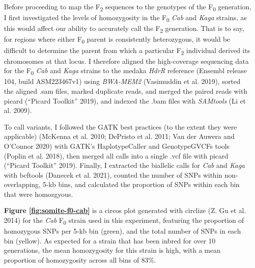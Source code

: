 \documentclass[
]{book}
\begin{document}
Before proceeding to map the F\textsubscript{2} sequences to the genotypes of the F\textsubscript{0} generation, I first investigated the levels of homozygosity in the F\textsubscript{0} \emph{Cab} and \emph{Kaga} strains, as this would affect our ability to accurately call the F\textsubscript{2} generation. That is to say, for regions where either F\textsubscript{0} parent is consistently heterozygous, it would be difficult to determine the parent from which a particular F\textsubscript{2} individual derived its chromosomes at that locus. I therefore aligned the high-coverage sequencing data for the F\textsubscript{0} \emph{Cab} and \emph{Kaga} strains to the medaka \emph{HdrR} reference (Ensembl release 104, build ASM223467v1) using \emph{BWA-MEM2} (Vasimuddin et al. 2019), sorted the aligned .sam files, marked duplicate reads, and merged the paired reads with picard ({``Picard Toolkit''} 2019), and indexed the .bam files with \emph{SAMtools} (Li et al. 2009).

To call variants, I followed the GATK best practices (to the extent they were applicable) (McKenna et al. 2010; DePristo et al. 2011; Van der Auwera and O'Connor 2020) with GATK's HaplotypeCaller and GenotypeGVCFs tools (Poplin et al. 2018), then merged all calls into a single .vcf file with picard ({``Picard Toolkit''} 2019). Finally, I extracted the biallelic calls for \emph{Cab} and \emph{Kaga} with bcftools (Danecek et al. 2021), counted the number of SNPs within non-overlapping, 5-kb bins, and calculated the proportion of SNPs within each bin that were homozgyous.

\textbf{Figure \ref{fig:somite-f0-cab}} is a circos plot generated with circlize (Z. Gu et al. 2014) for the \emph{Cab} F\textsubscript{0} strain used in this experiment, featuring the proportion of homozygous SNPs per 5-kb bin (green), and the total number of SNPs in each bin (yellow). As expected for a strain that has been inbred for over 10 generations, the mean homozygosity for this strain is high, with a mean proportion of homozygosity across all bins of 83\%.
\end{document}
